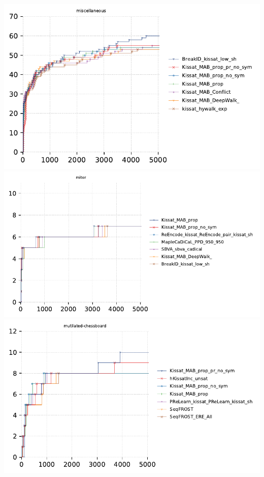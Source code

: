 \documentclass{article}
\begin{document}
\includegraphics[width=\linewidth]{gen/sc2023/cdfs/cdf-miscellaneous.pdf}
\includegraphics[width=\linewidth]{gen/sc2023/cdfs/cdf-miter.pdf}
\includegraphics[width=\linewidth]{gen/sc2023/cdfs/cdf-mutilated-chessboard.pdf}
\end{document}
